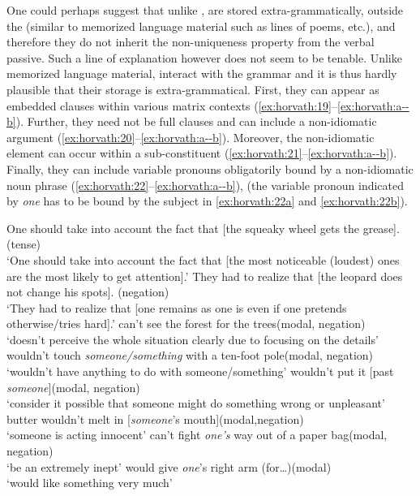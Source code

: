 \documentclass[output=paper,
modfonts
]{LSP/langsci}
\begin{document}
One could perhaps suggest that unlike ,  are
stored extra-grammatically, outside the  (similar to
memorized language material such as lines of poems, etc.), and therefore
they do not inherit the non-uniqueness property from the verbal passive.
Such a line of explanation however does not seem to be tenable. Unlike
memorized language material,  interact with the grammar
and it is thus hardly plausible that their storage is extra-grammatical.
First, they can appear as embedded clauses within various matrix
contexts (\ref{ex:horvath:19}--\ref{ex:horvath:a--b}). Further, they need not be full clauses and can include
a non-idiomatic argument (\ref{ex:horvath:20}--\ref{ex:horvath:a--b}). Moreover, the non-idiomatic element
can occur within a sub-constituent (\ref{ex:horvath:21}--\ref{ex:horvath:a--b}). Finally, they can include
variable pronouns obligatorily bound by a non-idiomatic noun phrase
(\ref{ex:horvath:22}--\ref{ex:horvath:a--b}), (the variable pronoun indicated by \emph{one} has to be bound
by the subject in \ref{ex:horvath:22a} and \ref{ex:horvath:22b}).
\largerpage

\ea \label{ex:horvath:19} 
	\ea \label{ex:horvath:19a} One should take into account the fact that {[}the squeaky wheel
	gets the grease{]}.\hfill (tense)\\
	`One should take into account the fact that {[}the most noticeable
	(loudest) ones are the most likely to get attention{]}.'
	\ex \label{ex:horvath:19b} They had to realize that {[}the leopard does not change his spots{]}. \hfill(negation)\\
	`They had to realize that {[}one remains as one is even if one pretends
	otherwise/tries hard{]}.'
	\z
\ex \label{ex:horvath:20} 
	\ea \label{ex:horvath:20a} can't see the forest for the trees\hfill (modal, negation)\\
	 `doesn't perceive the whole situation clearly due to focusing on the details'
	\ex \label{ex:horvath:20b} wouldn't touch \emph{someone/something} with a ten-foot pole\hfill (modal,
	negation)\\
	`wouldn't have anything to do with someone/something'
	\z
\ex \label{ex:horvath:21}
	\ea \label{ex:horvath:21a} wouldn't put it {[}past \emph{someone}{]}\hfill (modal, negation)\\
	`consider it possible that someone might do something wrong or
	unpleasant'
	\ex \label{ex:horvath:21b} butter wouldn't melt in {[}\emph{someone}'s mouth{]}\hfill (modal,negation)\\
	`someone is acting innocent'
	\z
\ex \label{ex:horvath:22}
	\ea \label{ex:horvath:22a} can't fight \emph{one's} way out of a paper bag\hfill (modal, negation)\\
	`be an extremely inept'
	\ex \label{ex:horvath:22b} would give \emph{one}'s right arm (for\ldots{})\hfill (modal)\\
	`would like something very much'
	\z
\z
\end{document}
